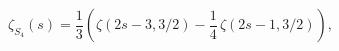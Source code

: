 \begin{equation}
\zeta_{S_4}(s)=\frac{1}{3}\left(\zeta(2s-3,3/2)
-\frac{1}{4}\,\zeta(2s-1,3/2)\right),
\label{s4zeta}
\end{equation}

